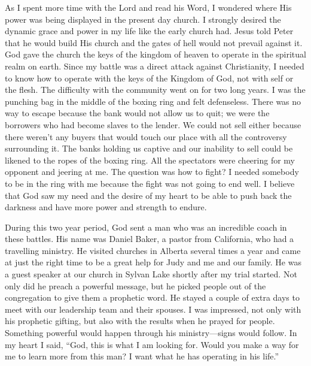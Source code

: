 \documentclass[oneside]{book}
\begin{document}
As I spent more time with the Lord and read his Word, I wondered where His power was being displayed in the present day church. I strongly desired the dynamic grace and power in my life like the early church had. Jesus told Peter that he would build His church and the gates of hell would not prevail against it. God gave the church the keys of the kingdom of heaven to operate in the spiritual realm on earth. Since my battle was a direct attack against Christianity, I needed to know how to operate with the keys of the Kingdom of God, not with self or the flesh. The difficulty with the community went on for two long years. I was the punching bag in the middle of the boxing ring and felt defenseless. There was no way to escape because the bank would not allow us to quit; we were the borrowers who had become slaves to the lender. We could not sell either because there weren’t any buyers that would touch our place with all the controversy surrounding it. The banks holding us captive and our inability to sell could be likened to the ropes of the boxing ring. All the spectators were cheering for my opponent and jeering at me. The question was how to fight? I needed somebody to be in the ring with me because the fight was not going to end well. I believe that God saw my need and the desire of my heart to be able to push back the darkness and have more power and strength to endure.

During this two year period, God sent a man who was an incredible coach in these battles. His name was Daniel Baker, a pastor from California, who had a travelling ministry. He visited churches in Alberta several times a year and came at just the right time to be a great help for Judy and me and our family. He was a guest speaker at our church in Sylvan Lake shortly after my trial started. Not only did he preach a powerful message, but he picked people out of the congregation to give them a prophetic word. He stayed a couple of extra days to meet with our leadership team and their spouses. I was impressed, not only with his prophetic gifting, but also with the results when he prayed for people. Something powerful would happen through his ministry—signs would follow. In my heart I said, “God, this is what I am looking for. Would you make a way for me to learn more from this man? I want what he has operating in his life.”
\end{document}
